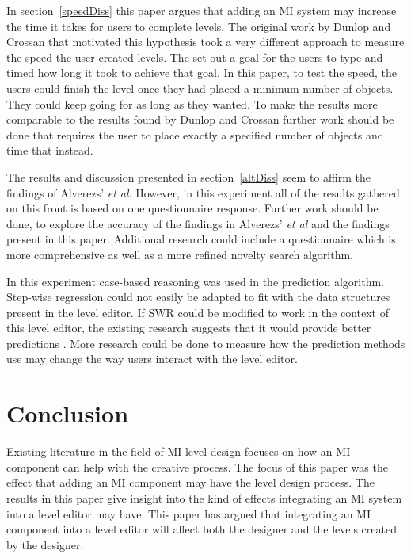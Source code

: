 \documentclass[journal]{IEEEtran}
\begin{document}
In section~\ref{speedDiss} this paper argues that adding an MI system may increase the time it takes for users to complete levels. The original work by Dunlop and Crossan\cite{dunlop2000predictive} that motivated this hypothesis took a very different approach to measure the speed the user created levels. The set out a goal for the users to type and timed how long it took to achieve that goal. In this paper, to test the speed, the users could finish the level once they had placed a minimum number of objects. They could keep going for as long as they wanted. To make the results more comparable to the results found by Dunlop and Crossan\cite{dunlop2000predictive} further work should be done that requires the user to place exactly a specified number of objects and time that instead.

The results and discussion presented in section~\ref{altDiss} seem to affirm the findings of Alverezs' \textit{et al}\cite{alvarez2018fostering}. However, in this experiment all of the results gathered on this front is based on one questionnaire response. Further work should be done, to explore the accuracy of the findings in Alverezs' \textit{et al}\cite{alvarez2018fostering} and the findings present in this paper. Additional research could include a questionnaire which is more comprehensive as well as a more refined novelty search algorithm.

In this experiment case-based reasoning was used in the prediction algorithm. Step-wise regression could not easily be adapted to fit with the data structures present in the level editor. If SWR could be modified to work in the context of this level editor, the existing research suggests that it would provide better predictions \cite{shepperd2001comparing, schroeder2016understanding}. More research could be done to measure how the prediction methods use may change the way users interact with the level editor. 

\section{Conclusion}
Existing literature in the field of MI level design focuses on how an MI component can help with the creative process. The focus of this paper was the effect that adding an MI component may have the level design process. The results in this paper give insight into the kind of effects integrating an MI system into a level editor may have. This paper has argued that integrating an MI component into a level editor will affect both the designer and the levels created by the designer.
\end{document}
